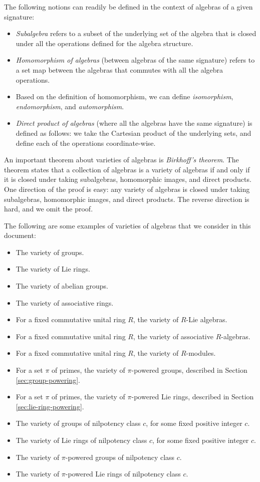 The following notions can readily be defined in the context of
algebras of a given signature:

\begin{itemize}
\item {\em Subalgebra} refers to a subset of the underlying set of the
  algebra that is closed under all the operations defined for the
  algebra structure.
\item {\em Homomorphism of algebras} (between algebras of the same
  signature) refers to a set map between the algebras that commutes
  with all the algebra operations.
\item Based on the definition of homomorphism, we can define {\em
  isomorphism}, {\em endomorphism}, and {\em automorphism}.
\item {\em Direct product of algebras} (where all the algebras have
  the same signature) is defined as follows: we take the Cartesian
  product of the underlying sets, and define each of the operations
  coordinate-wise.
\end{itemize}

An important theorem about varieties of algebras is {\em Birkhoff's
  theorem}. The theorem states that a collection of algebras is a
variety of algebras if and only if it is closed under taking
subalgebras, homomorphic images, and direct products. One direction of
the proof is easy: any variety of algebras is closed under taking
subalgebras, homomorphic images, and direct products. The reverse
direction is hard, and we omit the proof.

The following are some examples of varieties of algebras that we
consider in this document:

\begin{itemize}
\item The variety of groups.
\item The variety of Lie rings.
\item The variety of abelian groups.
\item The variety of associative rings.
\item For a fixed commutative unital ring $R$, the variety of $R$-Lie algebras.
\item For a fixed commutative unital ring $R$, the variety of
  associative $R$-algebras.
\item For a fixed commutative unital ring $R$, the variety of
  $R$-modules.
\item For a set $\pi$ of primes, the variety of $\pi$-powered groups,
  described in Section \ref{sec:group-powering}.
\item For a set $\pi$ of primes, the variety of $\pi$-powered Lie
  rings, described in Section \ref{sec:lie-ring-powering}.
\item The variety of groups of nilpotency class $c$, for some fixed
  positive integer $c$.
\item The variety of Lie rings of nilpotency class $c$, for some fixed
  positive integer $c$.
\item The variety of $\pi$-powered groups of nilpotency class $c$.
\item The variety of $\pi$-powered Lie rings of nilpotency class $c$.
\end{itemize}


